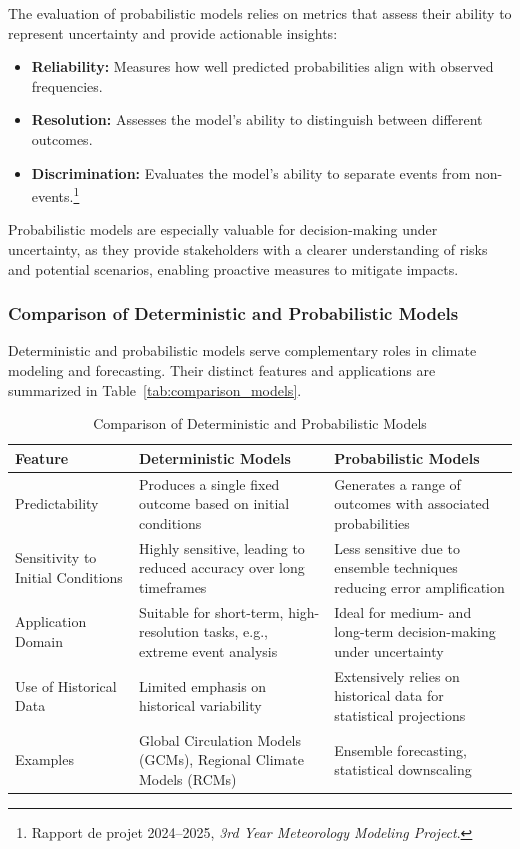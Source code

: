 The evaluation of probabilistic models relies on metrics that assess their ability to represent uncertainty and provide actionable insights:
\begin{itemize}
    \item \textbf{Reliability:} Measures how well predicted probabilities align with observed frequencies.
    \item \textbf{Resolution:} Assesses the model’s ability to distinguish between different outcomes.
    \item \textbf{Discrimination:} Evaluates the model’s ability to separate events from non-events.\footnote{Rapport de projet 2024–2025, \textit{3rd Year Meteorology Modeling Project}.}
\end{itemize}

Probabilistic models are especially valuable for decision-making under uncertainty, as they provide stakeholders with a clearer understanding of risks and potential scenarios, enabling proactive measures to mitigate impacts.

\subsubsection{Comparison of Deterministic and Probabilistic Models}
Deterministic and probabilistic models serve complementary roles in climate modeling and forecasting. Their distinct features and applications are summarized in Table~\ref{tab:comparison_models}.

\begin{table}[h!]
    \centering
    \caption{Comparison of Deterministic and Probabilistic Models}
    \begin{tabular}{@{}p{5cm}p{5cm}p{5cm}@{}}
    \toprule
    \textbf{Feature} & \textbf{Deterministic Models} & \textbf{Probabilistic Models} \\
    \midrule
    Predictability & Produces a single fixed outcome based on initial conditions & Generates a range of outcomes with associated probabilities \\
    \addlinespace
    Sensitivity to Initial Conditions & Highly sensitive, leading to reduced accuracy over long timeframes & Less sensitive due to ensemble techniques reducing error amplification \\
    \addlinespace
    Application Domain & Suitable for short-term, high-resolution tasks, e.g., extreme event analysis & Ideal for medium- and long-term decision-making under uncertainty \\
    \addlinespace
    Use of Historical Data & Limited emphasis on historical variability & Extensively relies on historical data for statistical projections \\
    \addlinespace
    Examples & Global Circulation Models (GCMs), Regional Climate Models (RCMs) & Ensemble forecasting, statistical downscaling \\
    \bottomrule
    \end{tabular}
\end{table}

